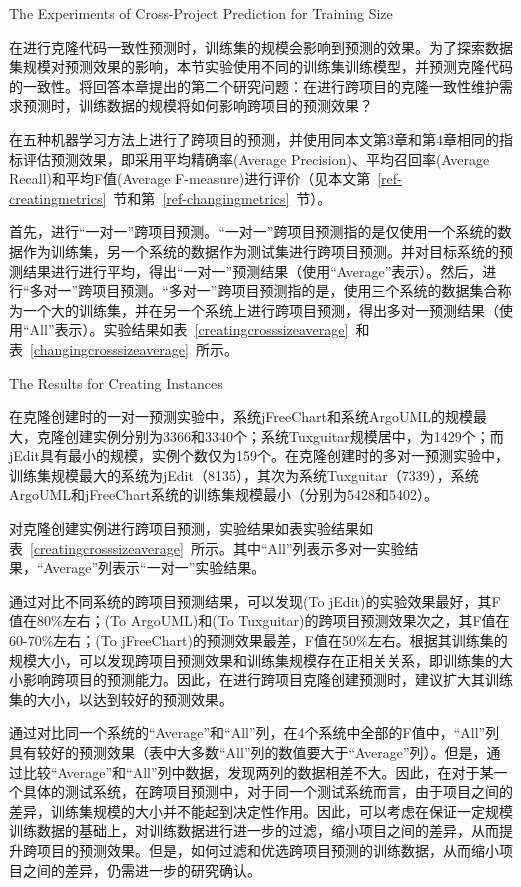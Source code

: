 {The Experiments of Cross-Project Prediction for Training Size}

在进行克隆代码一致性预测时，训练集的规模会影响到预测的效果。为了探索数据集规模对预测效果的影响，本节实验使用不同的训练集训练模型，并预测克隆代码的一致性。将回答本章提出的第二个研究问题：在进行跨项目的克隆一致性维护需求预测时，训练数据的规模将如何影响跨项目的预测效果？

在五种机器学习方法上进行了跨项目的预测，并使用同本文第3章和第4章相同的指标评估预测效果，即采用平均精确率(Average Precision)、平均召回率(Average Recall)和平均F值(Average F-measure)进行评价（见本文第~\ref{ref-creatingmetrics}~节和第~\ref{ref-changingmetrics}~节）。

首先，进行“一对一”跨项目预测。“一对一”跨项目预测指的是仅使用一个系统的数据作为训练集，另一个系统的数据作为测试集进行跨项目预测。并对目标系统的预测结果进行进行平均，得出“一对一”预测结果（使用“Average”表示）。然后，进行“多对一”跨项目预测。“多对一”跨项目预测指的是，使用三个系统的数据集合称为一个大的训练集，并在另一个系统上进行跨项目预测，得出多对一预测结果（使用“All”表示）。实验结果如表~\ref{creatingcrosssizeaverage}~和表~\ref{changingcrosssizeaverage}~所示。

{The Results for Creating Instances}

在克隆创建时的一对一预测实验中，系统jFreeChart和系统ArgoUML的规模最大，克隆创建实例分别为3366和3340个；系统Tuxguitar规模居中，为1429个；而jEdit具有最小的规模，实例个数仅为159个。在克隆创建时的多对一预测实验中，训练集规模最大的系统为jEdit（8135），其次为系统Tuxguitar（7339），系统ArgoUML和jFreeChart系统的训练集规模最小（分别为5428和5402）。

对克隆创建实例进行跨项目预测，实验结果如表实验结果如表~\ref{creatingcrosssizeaverage}~所示。其中“All”列表示多对一实验结果，“Average”列表示“一对一”实验结果。

通过对比不同系统的跨项目预测结果，可以发现(To jEdit)的实验效果最好，其F值在80\%左右；(To ArgoUML)和(To Tuxguitar)的跨项目预测效果次之，其F值在60-70\%左右；(To jFreeChart)的预测效果最差，F值在50\%左右。根据其训练集的规模大小，可以发现跨项目预测效果和训练集规模存在正相关关系，即训练集的大小影响跨项目的预测能力。因此，在进行跨项目克隆创建预测时，建议扩大其训练集的大小，以达到较好的预测效果。%

通过对比同一个系统的“Average”和“All”列，在4个系统中全部的F值中，“All”列具有较好的预测效果（表中大多数“All”列的数值要大于“Average”列）。但是，通过比较“Average”和“All”列中数据，发现两列的数据相差不大。因此，在对于某一个具体的测试系统，在跨项目预测中，对于同一个测试系统而言，由于项目之间的差异，训练集规模的大小并不能起到决定性作用。因此，可以考虑在保证一定规模训练数据的基础上，对训练数据进行进一步的过滤，缩小项目之间的差异，从而提升跨项目的预测效果。但是，如何过滤和优选跨项目预测的训练数据，从而缩小项目之间的差异，仍需进一步的研究确认。

